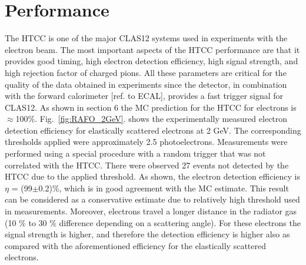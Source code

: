 \section{Performance}The HTCC is one of the major CLAS12 systems used in experiments with the electron beam. The most important aspects of the HTCC performance are that it provides good timing, high electron detection efficiency, high signal strength, and high rejection factor of charged pions. All these parameters are critical for the quality of the data obtained in experiments since the detector, in combination with the forward calorimeter [ref. to ECAL], provides a fast trigger signal for CLAS12. As shown in section 6 the MC prediction for the HTCC for electrons is $\approx$100\%. Fig.~\ref{fig:RAFO_2GeV}. shows the experimentally measured electron detection efficiency for elastically scattered electrons at 2 GeV. The corresponding thresholds applied were approximately 2.5 photoelectrons. Measurements were performed using a special procedure with a random trigger that was not correlated with the HTCC. There were observed 27 events not detected by the HTCC due to the applied threshold. As shown, the electron detection efficiency is $\eta$ = (99$\pm$0.2)\%, which is in good agreement with the MC estimate. This result can be considered as a conservative estimate due to relatively high threshold used in measurements. Moreover, electrons travel a longer distance in the radiator gas (10 \% to 30 \% difference depending on a scattering angle). For these electrons the signal strength is higher, and therefore the detection efficiency is higher also as compared with the aforementioned efficiency for the elastically scattered electrons.   

